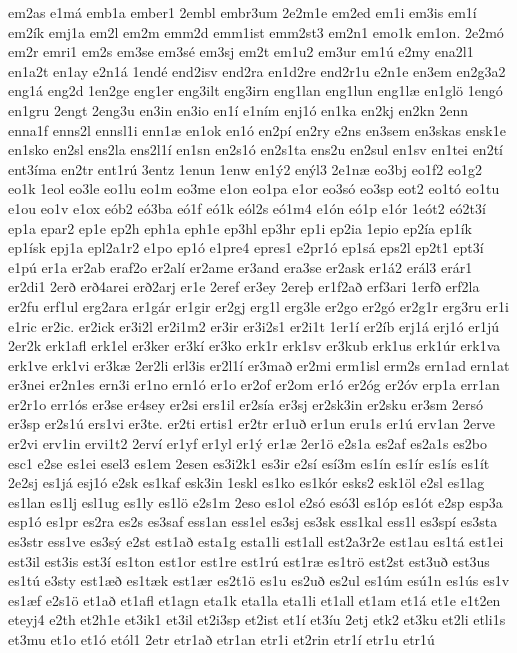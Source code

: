 {em2as
e1má
emb1a
ember1
2embl
embr3um
2e2m1e
em2ed
em1i
em3is
em1í
em2ík
emj1a
em2l
em2m
emm2d
emm1ist
emm2st3
em2n1
emo1k
em1on.
2e2mó
em2r
emri1
em2s
em3se
em3sé
em3sj
em2t
em1u2
em3ur
em1ú
e2my
ena2l1
en1a2t
en1ay
e2n1á
1endé
end2isv
end2ra
en1d2re
end2r1u
e2n1e
en3em
en2g3a2
eng1á
eng2d
1en2ge
eng1er
eng3ilt
eng3irn
eng1lan
eng1lun
eng1læ
en1glö
1engó
en1gru
2engt
2eng3u
en3in
en3io
en1í
e1ním
enj1ó
en1ka
en2kj
en2kn
2enn
enna1f
enns2l
ennsl1i
enn1æ
en1ok
en1ó
en2pí
en2ry
e2ns
en3sem
en3skas
ensk1e
en1sko
en2sl
ens2la
ens2l1í
en1sn
en2s1ó
en2s1ta
ens2u
en2sul
en1sv
en1tei
en2tí
ent3íma
en2tr
ent1rú
3entz
1enun
1enw
en1ý2
enýl3
2e1næ
eo3bj
eo1f2
eo1g2
eo1k
1eol
eo3le
eo1lu
eo1m
eo3me
e1on
eo1pa
e1or
eo3só
eo3sp
eot2
eo1tó
eo1tu
e1ou
eo1v
e1ox
eób2
eó3ba
eó1f
eó1k
eól2s
eó1m4
e1ón
eó1p
e1ór
1eót2
eó2t3í
ep1a
epar2
ep1e
ep2h
eph1a
eph1e
ep3hl
ep3hr
ep1i
ep2ia
1epio
ep2ía
ep1ík
ep1ísk
epj1a
epl2a1r2
e1po
ep1ó
e1pre4
epres1
e2pr1ó
ep1sá
eps2l
ep2t1
ept3í
e1pú
er1a
er2ab
eraf2o
er2alí
er2ame
er3and
era3se
er2ask
er1á2
erál3
erár1
er2di1
2erð
erð4arei
erð2arj
er1e
2eref
er3ey
2ereþ
er1f2að
erf3ari
1erfð
erf2la
er2fu
erf1ul
erg2ara
er1gár
er1gir
er2gj
erg1l
erg3le
er2go
er2gó
er2g1r
erg3ru
er1i
e1ric
er2ic.
er2ick
er3i2l
er2i1m2
er3ir
er3i2s1
er2i1t
1er1í
er2íb
erj1á
erj1ó
er1jú
2er2k
erk1afl
erk1el
er3ker
er3kí
er3ko
erk1r
erk1sv
er3kub
erk1us
erk1úr
erk1va
erk1ve
erk1vi
er3kæ
2er2li
erl3is
er2l1í
er3mað
er2mi
erm1isl
erm2s
ern1ad
ern1at
er3nei
er2n1es
ern3i
er1no
ern1ó
er1o
er2of
er2om
er1ó
er2óg
er2óv
erp1a
err1an
er2r1o
err1ós
er3se
er4sey
er2si
ers1il
er2sía
er3sj
er2sk3in
er2sku
er3sm
2ersó
er3sp
er2s1ú
ers1vi
er3te.
er2ti
ertis1
er2tr
er1uð
er1un
eru1s
er1ú
erv1an
2erve
er2vi
erv1in
ervi1t2
2erví
er1yf
er1yl
er1ý
er1æ
2er1ö
e2s1a
es2af
es2a1s
es2bo
esc1
e2se
es1ei
esel3
es1em
2esen
es3i2k1
es3ir
e2sí
esí3m
es1ín
es1ír
es1ís
es1ít
2e2sj
es1já
esj1ó
e2sk
es1kaf
esk3in
1eskl
es1ko
es1kór
esks2
esk1öl
e2sl
es1lag
es1lan
es1lj
esl1ug
es1ly
es1lö
e2s1m
2eso
es1ol
e2só
esó3l
es1óp
es1ót
e2sp
esp3a
esp1ó
es1pr
es2ra
es2s
es3saf
ess1an
ess1el
es3sj
es3sk
ess1kal
ess1l
es3spí
es3sta
es3str
ess1ve
es3sý
e2st
est1að
esta1g
esta1li
est1all
est2a3r2e
est1au
es1tá
est1ei
est3il
est3is
est3í
es1ton
est1or
est1re
est1rú
est1ræ
es1trö
est2st
est3uð
est3us
es1tú
e3sty
est1æð
es1tæk
est1ær
es2t1ö
es1u
es2uð
es2ul
es1úm
esú1n
es1ús
es1v
es1æf
e2s1ö
et1að
et1afl
et1agn
eta1k
eta1la
eta1li
et1all
et1am
et1á
et1e
e1t2en
eteyj4
e2th
et2h1e
et3ik1
et3il
et2i3sp
et2ist
et1í
et3íu
2etj
etk2
et3ku
et2li
etli1s
et3mu
et1o
et1ó
etól1
2etr
etr1að
etr1an
etr1i
et2rin
etr1í
etr1u
etr1ú
}

